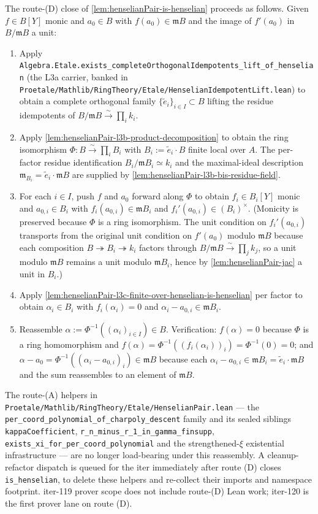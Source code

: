 The route-(D) close of \cref{lem:henselianPair-is-henselian}
proceeds as follows. Given $f \in B[Y]$ monic and $a_0 \in B$
with $f(a_0) \in \mathfrak m B$ and the image of $f'(a_0)$ in
$B/\mathfrak m B$ a unit:
\begin{enumerate}
\item Apply
\texttt{Algebra.Etale.exists\_completeOrthogonalIdempotents\_lift\_of\_henselian}
(the L3a carrier, banked in
\texttt{Proetale/Mathlib/RingTheory/Etale/HenselianIdempotentLift.lean})
to obtain a complete orthogonal family
$\{\tilde e_i\}_{i \in I} \subset B$ lifting the residue
idempotents of $B/\mathfrak m B \xrightarrow{\sim}
\prod_i k_i$.
\item Apply
\cref{lem:henselianPair-l3b-product-decomposition} to obtain the
ring isomorphism $\Phi : B \xrightarrow{\sim} \prod_i B_i$ with
$B_i := \tilde e_i \cdot B$ finite local over $A$. The
per-factor residue identification $B_i / \mathfrak m B_i \simeq
k_i$ and the maximal-ideal description $\mathfrak m_{B_i} =
\tilde e_i \cdot \mathfrak m B$ are supplied by
\cref{lem:henselianPair-l3b-bis-residue-field}.
\item For each $i \in I$, push $f$ and $a_0$ forward along
$\Phi$ to obtain $f_i \in B_i[Y]$ monic and $a_{0,i} \in B_i$
with $f_i(a_{0,i}) \in \mathfrak m B_i$ and $f_i'(a_{0,i}) \in
(B_i)^\times$. (Monicity is preserved because $\Phi$ is a ring
isomorphism. The unit condition on $f_i'(a_{0,i})$ transports
from the original unit condition on $f'(a_0)$ modulo
$\mathfrak m B$ because each composition $B \twoheadrightarrow
B_i \twoheadrightarrow k_i$ factors through $B/\mathfrak m B
\xrightarrow{\sim} \prod_j k_j$, so a unit modulo
$\mathfrak m B$ remains a unit modulo $\mathfrak m B_i$, hence
by \cref{lem:henselianPair-jac} a unit in $B_i$.)
\item Apply
\cref{lem:henselianPair-l3c-finite-over-henselian-is-henselian}
per factor to obtain $\alpha_i \in B_i$ with $f_i(\alpha_i) = 0$
and $\alpha_i - a_{0,i} \in \mathfrak m B_i$.
\item Reassemble $\alpha := \Phi^{-1}((\alpha_i)_{i \in I}) \in
B$. Verification: $f(\alpha) = 0$ because $\Phi$ is a ring
homomorphism and $f(\alpha) = \Phi^{-1}((f_i(\alpha_i))_i) =
\Phi^{-1}(0) = 0$; and $\alpha - a_0 = \Phi^{-1}((\alpha_i -
a_{0,i})_i) \in \mathfrak m B$ because each
$\alpha_i - a_{0,i} \in \mathfrak m B_i = \tilde e_i \cdot
\mathfrak m B$ and the sum reassembles to an element of
$\mathfrak m B$.
\end{enumerate}
The route-(A) helpers in
\texttt{Proetale/Mathlib/RingTheory/Etale/HenselianPair.lean} —
the \texttt{per\_coord\_polynomial\_of\_charpoly\_descent} family
and its sealed siblings \texttt{kappaCoefficient},
\texttt{r\_n\_minus\_r\_1\_in\_gamma\_finsupp},
\texttt{exists\_xi\_for\_per\_coord\_polynomial} and the
strengthened-$\xi$ existential infrastructure — are no longer
load-bearing under this reassembly. A cleanup-refactor dispatch
is queued for the iter immediately after route (D) closes
\texttt{is\_henselian}, to delete these helpers and re-collect
their imports and namespace footprint. iter-119 prover scope
does not include route-(D) Lean work; iter-120 is the first
prover lane on route (D).

